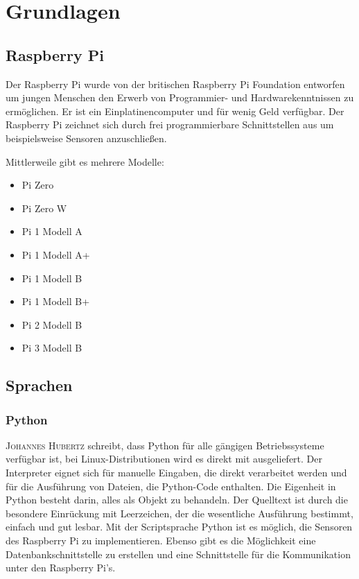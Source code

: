 \chapter{Grundlagen}

\section{Raspberry Pi}
Der Raspberry Pi wurde von der britischen Raspberry Pi Foundation entworfen um
jungen Menschen den Erwerb von Programmier- und Hardwarekenntnissen zu
ermöglichen. Er ist ein Einplatinencomputer und für wenig Geld verfügbar. Der
Raspberry Pi zeichnet sich durch frei programmierbare Schnittstellen aus um
beispielsweise Sensoren anzuschließen.

Mittlerweile gibt es mehrere Modelle:

\begin{itemize} 
\item Pi Zero 
\item Pi Zero W
\item Pi 1 Modell A
\item Pi 1 Modell A+
\item Pi 1 Modell B
\item Pi 1 Modell B+
\item Pi 2 Modell B
\item Pi 3 Modell B 
\end{itemize}


\section{Sprachen}

\subsection{Python}\label{Python}
\textsc{Johannes Hubertz}\cite{hubertz2016softwaretests} schreibt, dass Python für alle gängigen Betriebssysteme verfügbar ist, bei Linux-Distributionen wird es direkt mit ausgeliefert. Der Interpreter eignet sich für manuelle Eingaben, die direkt verarbeitet werden und für die Ausführung von Dateien, die Python-Code enthalten. Die Eigenheit in Python besteht darin, alles als Objekt zu behandeln. Der Quelltext ist durch die besondere Einrückung mit Leerzeichen, der die wesentliche Ausführung bestimmt, einfach und gut lesbar.  Mit der Scriptsprache Python ist es möglich, die Sensoren des Raspberry Pi zu implementieren. Ebenso gibt es die Möglichkeit eine Datenbankschnittstelle zu erstellen und eine Schnittstelle für die Kommunikation unter den Raspberry Pi's.

